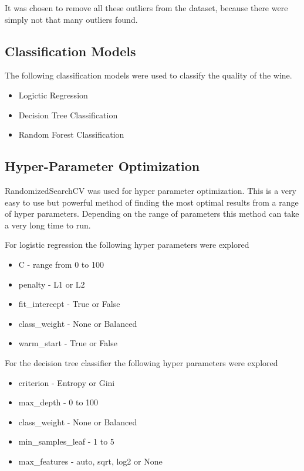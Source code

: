 It was chosen to remove all these outliers from the dataset, because there were simply not that many outliers found.

\subsection{Classification Models}

The following classification models were used to classify the quality of the wine. 

\begin{itemize}
  \item Logictic Regression
  \item Decision Tree Classification
  \item Random Forest Classification
\end{itemize}

\subsection{Hyper-Parameter Optimization}

RandomizedSearchCV was used for hyper parameter optimization. This is a very easy to use but powerful method of finding the most optimal results from a range of hyper parameters. Depending on the range of parameters this method can take a very long time to run.

For logistic regression the following hyper parameters were explored

\begin{itemize}
  \item C - range from 0 to 100
  \item penalty - L1 or L2
  \item fit\_intercept - True or False
  \item class\_weight - None or Balanced
  \item warm\_start - True or False
\end{itemize}

For the decision tree classifier the following hyper parameters were explored

\begin{itemize}
  \item criterion - Entropy or Gini
  \item max\_depth - 0 to 100
  \item class\_weight - None or Balanced
  \item min\_samples\_leaf - 1 to 5
  \item max\_features - auto, sqrt, log2 or None
\end{itemize}



